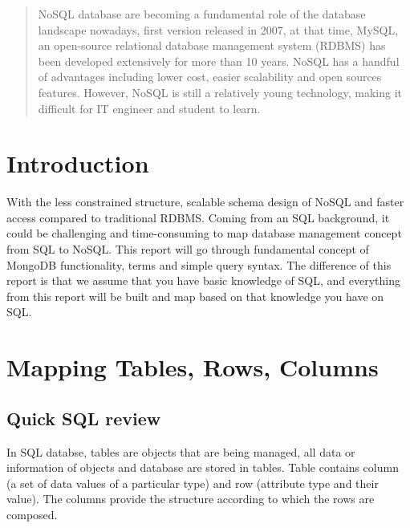 \documentclass[conference]{IEEEtran}
\begin{document}
\begin{abstract}
NoSQL database are becoming a fundamental role of the database landscape nowadays, first version released in 2007, at that time, MySQL, an open-source relational database management system (RDBMS) has been developed extensively for more than 10 years. NoSQL has a handful of advantages including lower cost, easier scalability and open sources features. However, NoSQL is still a relatively young technology, making it difficult for  IT engineer and student to learn.
\end{abstract}





%
\IEEEpeerreviewmaketitle


\section{Introduction}
With the less constrained structure, scalable schema design of NoSQL and faster access compared to traditional RDBMS. Coming from an SQL background, it could be challenging and time-consuming to map database management concept from SQL to NoSQL. This report will go through fundamental concept of MongoDB functionality, terms and simple query syntax. The difference of this report is that we assume that you have basic knowledge of SQL, and everything from this report will be built and map based on that knowledge you have on SQL.
\section{Mapping Tables, Rows, Columns}
\subsection{Quick SQL review}
In SQL databse, tables are objects that are being managed, all data or information of objects and database are stored in tables. Table contains column (a set of data values of a particular type) and row (attribute type and their value). The columns provide the structure according to which the rows are composed.
\end{document}
